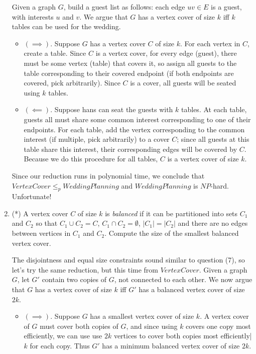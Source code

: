 \documentclass[fleqn]{article}
\begin{document}
\begin{enumerate}
\begin{answer}
        Given a graph $G$, build a guest list as follows: each edge $uv \in E$ is a guest, with interests $u$ and $v$. We argue that $G$ has a vertex cover of size $k$ iff $k$ tables can be used for the wedding.
        \begin{itemize}
            \item $(\implies)$. Suppose $G$ has a vertex cover $C$ of size $k$. For each vertex in $C$, create a table. Since $C$ is a vertex cover, for every edge (guest), there must be some vertex (table) that covers it, so assign all guests to the table corresponding to their covered endpoint (if both endpoints are covered, pick arbitrarily). Since $C$ is a cover, all guests will be seated using $k$ tables.
            \item $(\impliedby)$. Suppose hans can seat the guests with $k$ tables. At each table, guests all must share some common interest corresponding to one of their endpoints. For each table, add the vertex corresponding to the common interest (if multiple, pick arbitrarily) to a cover $C$; since all guests at this table share this interest, their corresponding edges will be covered by $C$. Because we do this procedure for all tables, $C$ is a vertex cover of size $k$.
        \end{itemize}
        Since our reduction runs in polynomial time, we conclude that $VertexCover \leq_p WeddingPlanning$ and $WeddingPlanning$ is $NP$-hard. Unfortunate!
    \end{answer}
    \item (*) A vertex cover $C$ of size $k$ is \textit{balanced} if it can be partitioned into sets $C_1$ and $C_2$ so that $C_1 \cup C_2 = C$, $C_1 \cap C_2 = \emptyset$, $|C_1| = |C_2|$ and there are no edges between vertices in $C_1$ and $C_2$. Compute the size of the smallest balanced vertex cover.
    \begin{answer}
        The disjointness and equal size constraints sound similar to question (7), so let's try the same reduction, but this time from $VertexCover$. Given a graph $G$, let $G'$ contain two copies of $G$, not connected to each other. We now argue that $G$ has a vertex cover of size $k$ iff $G'$ has a balanced vertex cover of size $2k$.
        \begin{itemize}
            \item $(\implies)$. Suppose $G$ has a smallest vertex cover of size $k$. A vertex cover of $G$ must cover both copies of $G$, and since using $k$ covers one copy most efficiently, we can use use $2k$ vertices to cover both copies most efficiently|$k$ for each copy. Thus $G'$ has a minimum balanced vertex cover of size $2k$.

\end{itemize}
\end{answer}
\end{enumerate}
\end{document}
